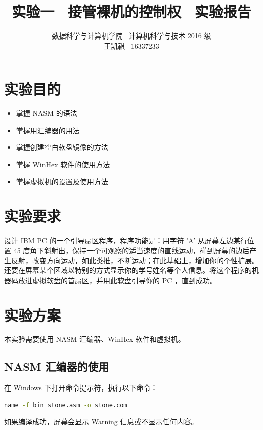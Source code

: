 \documentclass{article}
\begin{document}
\title{实验一 \ 接管裸机的控制权 \ 实验报告}
\author {数据科学与计算机学院 \ 计算机科学与技术 2016 级 \\ 王凯祺 \ 16337233}
\maketitle

\section{实验目的}

\begin{itemize}
\item 掌握 NASM 的语法
\item 掌握用汇编器的用法
\item 掌握创建空白软盘镜像的方法
\item 掌握 WinHex 软件的使用方法
\item 掌握虚拟机的设置及使用方法
\end{itemize}

\section{实验要求}

设计 IBM PC 的一个引导扇区程序，程序功能是：用字符 'A' 从屏幕左边某行位置 45 度角下斜射出，保持一个可观察的适当速度的直线运动，碰到屏幕的边后产生反射，改变方向运动，如此类推，不断运动；在此基础上，增加你的个性扩展。还要在屏幕某个区域以特别的方式显示你的学号姓名等个人信息。将这个程序的机器码放进虚拟软盘的首扇区，并用此软盘引导你的 PC ，直到成功。

\section{实验方案}

本实验需要使用 NASM 汇编器、WinHex 软件和虚拟机。

\subsection{NASM 汇编器的使用}

在 Windows 下打开命令提示符，执行以下命令：

\begin{lstlisting}[language=bash]
name -f bin stone.asm -o stone.com
\end{lstlisting}

如果编译成功，屏幕会显示 Warning 信息或不显示任何内容。
\end{document}
